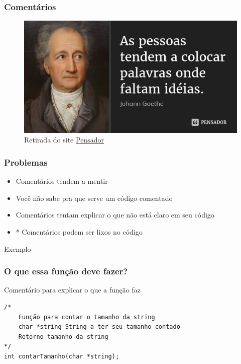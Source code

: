 \begin{frame}
	\frametitle{Comentários}

	\begin{figure}[h]
		\centering
			\includegraphics[height=0.6\paperheight]{figuras/johann}
		\caption{Retirada do site \href{https://www.pensador.com/frase/MzI2/}{Pensador}}\label{figure:johann}
	\end{figure}

\end{frame}

\begin{frame}
	\frametitle{Problemas}

	\begin{itemize}
		\item Comentários tendem a mentir
		\item Você não sabe pra que serve um código comentado
		\item Comentários tentam explicar o que não está claro em seu código
		\item * Comentários podem ser lixos no código
	\end{itemize}

\end{frame}

\begin{frame}
	\Huge Exemplo
\end{frame}

\begin{frame}[fragile]
	\frametitle{O que essa função deve fazer?}

	\begin{listing}[H]
		\caption{Comentário para explicar o que a função faz}
		\begin{verbatim}
/*
	Função para contar o tamanho da string
	char *string String a ter seu tamanho contado
	Retorno tamanho da string
*/
int contarTamanho(char *string);
		\end{verbatim}

	\end{listing}

\end{frame}

